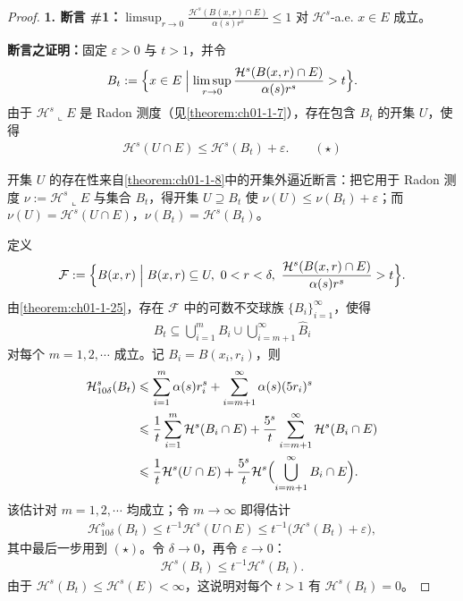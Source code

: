 \documentclass[../../main.tex]{subfiles}%
\begin{document}
\begin{proof}
\textbf{1. 断言 \#1：}$\limsup_{r\to0}\frac{\mathcal{H}^s(B(x,r)\cap E)}{\alpha(s)r^s}\leqslant1$ 对 $\mathcal{H}^s$-a.e. $x\in E$ 成立。

\textbf{断言之证明：}固定 $\varepsilon>0$ 与 $t>1$，并令
\begin{align*}
B_t:=\Bigl\{x\in E\Bigm|\limsup_{r\to0}\frac{\mathcal{H}^s(B(x,r)\cap E)}{\alpha(s)r^s}>t\Bigr\} .
\end{align*}
由于 $\mathcal{H}^s\llcorner E$ 是 Radon 测度（见\cref{theorem:ch01-1-7}），存在包含 $B_t$ 的开集 $U$，使得%
\begin{align*}
\mathcal{H}^s(U\cap E)\leqslant\mathcal{H}^s(B_t)+\varepsilon . \qquad(\star)
\end{align*}

开集 $U$ 的存在性来自\cref{theorem:ch01-1-8}中的开集外逼近断言：把它用于 Radon 测度 $\nu:=\mathcal{H}^s\llcorner E$ 与集合 $B_t$，得开集 $U\supseteq B_t$ 使 $\nu(U)\leqslant\nu(B_t)+\varepsilon$；而 $\nu(U)=\mathcal{H}^s(U\cap E)$，$\nu(B_t)=\mathcal{H}^s(B_t)$。%

定义
\begin{align*}
\mathcal{F}:=\Bigl\{B(x,r)\Bigm|B(x,r)\subseteq U,\ 0<r<\delta,\ \frac{\mathcal{H}^s(B(x,r)\cap E)}{\alpha(s)r^s}>t\Bigr\} .
\end{align*}
由\cref{theorem:ch01-1-25}，存在 $\mathcal{F}$ 中的可数不交球族 $\{B_i\}_{i=1}^{\infty}$，使得%
\begin{align*}
B_t\subseteq\bigcup_{i=1}^{m}B_i\cup\bigcup_{i=m+1}^{\infty}\hat B_i
\end{align*}
对每个 $m=1,2,\cdots$ 成立。记 $B_i=B(x_i,r_i)$，则
\begin{align*}
\mathcal{H}^s_{10\delta}(B_t)
&\leqslant\sum_{i=1}^{m}\alpha(s)r_i^s+\sum_{i=m+1}^{\infty}\alpha(s)(5r_i)^s\\
&\leqslant\frac{1}{t}\sum_{i=1}^{m}\mathcal{H}^s(B_i\cap E)+\frac{5^s}{t}\sum_{i=m+1}^{\infty}\mathcal{H}^s(B_i\cap E)\\
&\leqslant\frac{1}{t}\mathcal{H}^s(U\cap E)+\frac{5^s}{t}\mathcal{H}^s\Bigl(\bigcup_{i=m+1}^{\infty}B_i\cap E\Bigr) .
\end{align*}
该估计对 $m=1,2,\cdots$ 均成立；令 $m\to\infty$ 即得估计
\begin{align*}
\mathcal{H}^s_{10\delta}(B_t)\leqslant t^{-1}\mathcal{H}^s(U\cap E)\leqslant t^{-1}\bigl(\mathcal{H}^s(B_t)+\varepsilon\bigr),
\end{align*}
其中最后一步用到 $(\star)$。令 $\delta\to0$，再令 $\varepsilon\to0$：
\begin{align*}
\mathcal{H}^s(B_t)\leqslant t^{-1}\mathcal{H}^s(B_t) .
\end{align*}
由于 $\mathcal{H}^s(B_t)\leqslant\mathcal{H}^s(E)<\infty$，这说明对每个 $t>1$ 有 $\mathcal{H}^s(B_t)=0$。


\end{proof}
\end{document}
